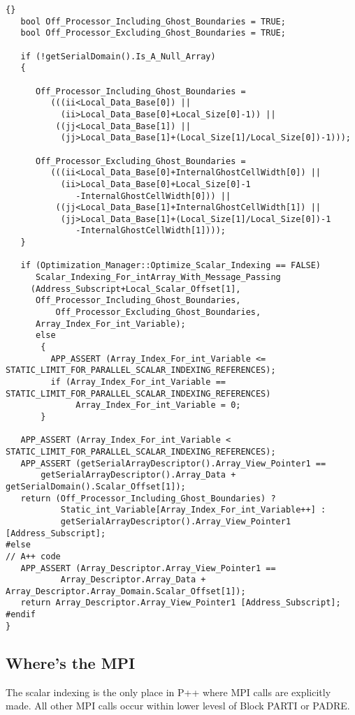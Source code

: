 \documentclass[10pt]{llncs}
\begin{document}
\begin{lstlisting}{}
   bool Off_Processor_Including_Ghost_Boundaries = TRUE;
   bool Off_Processor_Excluding_Ghost_Boundaries = TRUE;

   if (!getSerialDomain().Is_A_Null_Array)
   {

      Off_Processor_Including_Ghost_Boundaries =
         (((ii<Local_Data_Base[0]) ||
           (ii>Local_Data_Base[0]+Local_Size[0]-1)) ||
          ((jj<Local_Data_Base[1]) ||
           (jj>Local_Data_Base[1]+(Local_Size[1]/Local_Size[0])-1)));

      Off_Processor_Excluding_Ghost_Boundaries =
         (((ii<Local_Data_Base[0]+InternalGhostCellWidth[0]) || 
           (ii>Local_Data_Base[0]+Local_Size[0]-1
              -InternalGhostCellWidth[0])) ||
          ((jj<Local_Data_Base[1]+InternalGhostCellWidth[1]) || 
           (jj>Local_Data_Base[1]+(Local_Size[1]/Local_Size[0])-1
              -InternalGhostCellWidth[1])));
   }

   if (Optimization_Manager::Optimize_Scalar_Indexing == FALSE)
      Scalar_Indexing_For_intArray_With_Message_Passing 
	 (Address_Subscript+Local_Scalar_Offset[1], 
	  Off_Processor_Including_Ghost_Boundaries,
          Off_Processor_Excluding_Ghost_Boundaries,
	  Array_Index_For_int_Variable);
      else
       {
         APP_ASSERT (Array_Index_For_int_Variable <= STATIC_LIMIT_FOR_PARALLEL_SCALAR_INDEXING_REFERENCES);
         if (Array_Index_For_int_Variable == STATIC_LIMIT_FOR_PARALLEL_SCALAR_INDEXING_REFERENCES)
              Array_Index_For_int_Variable = 0;
       }

   APP_ASSERT (Array_Index_For_int_Variable < STATIC_LIMIT_FOR_PARALLEL_SCALAR_INDEXING_REFERENCES);
   APP_ASSERT (getSerialArrayDescriptor().Array_View_Pointer1 == 
       getSerialArrayDescriptor().Array_Data + getSerialDomain().Scalar_Offset[1]);
   return (Off_Processor_Including_Ghost_Boundaries) ? 
           Static_int_Variable[Array_Index_For_int_Variable++] : 
           getSerialArrayDescriptor().Array_View_Pointer1 [Address_Subscript];
#else
// A++ code
   APP_ASSERT (Array_Descriptor.Array_View_Pointer1 == 
	       Array_Descriptor.Array_Data + Array_Descriptor.Array_Domain.Scalar_Offset[1]);
   return Array_Descriptor.Array_View_Pointer1 [Address_Subscript];
#endif
}

\end{lstlisting}

\newpage
\subsection{Where's the MPI}
    The scalar indexing is the only place in P++ where MPI calls are explicitly made.  All other
MPI calls occur within lower levesl of Block PARTI or PADRE.
\end{document}
